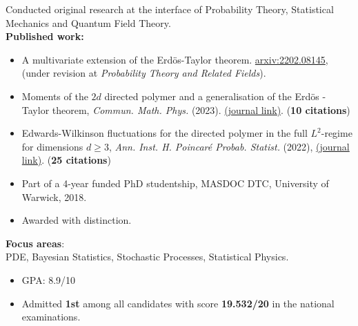 
\medskip
Conducted original research at the interface of Probability Theory, Statistical Mechanics and Quantum Field Theory. \\
\smallskip
{\bf Published work:}
\medskip
\begin{itemize}
    \item A multivariate extension of the Erd\"os-Taylor theorem. \href{https://arxiv.org/abs/2202.08145}{ \selectfont arxiv:2202.08145}, (under revision at {\em Probability Theory and Related Fields}).

    \item Moments of the $2d$ directed polymer and a generalisation of the Erd\"os - Taylor theorem,
        {\em Commun. Math. Phys.} (2023). \href{https://link.springer.com/article/10.1007/s00220-023-04694-w}{(journal link)}. ({\bf 10 citations})

    \item Edwards-Wilkinson fluctuations for the directed polymer in the full $L^2$-regime for dimensions $d \geq 3$, {\em Ann. Inst. H. Poincaré Probab. Statist.} (2022), \href{https://projecteuclid.org/journals/annales-de-linstitut-henri-poincare-probabilites-et-statistiques/volume-58/issue-1/EdwardsWilkinson-fluctuations-for-the-directed-polymer-in-the-full-L2/10.1214/21-AIHP1173.short}{(journal link)}. ({\bf 25 citations})

\end{itemize}


\bigskip



\begin{itemize}
    \item Part of a 4-year funded PhD studentship, MASDOC DTC, University of Warwick, 2018.
    \item Awarded with distinction.
\end{itemize}
\smallskip
{\bf Focus areas}: \\
\smallskip
PDE, Bayesian Statistics, Stochastic Processes, Statistical Physics.

\bigskip

\begin{itemize}
    \item GPA: 8.9/10
    \item Admitted {\bf 1st} among all candidates with score {\bf 19.532/20} in the national examinations.
\end{itemize}

